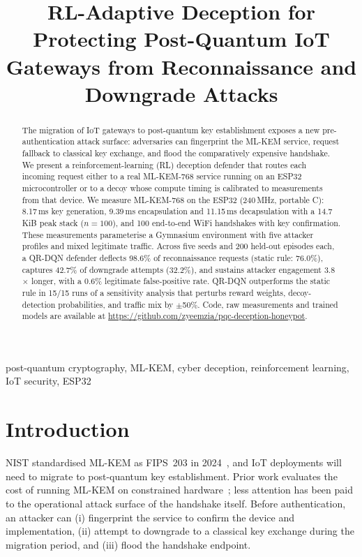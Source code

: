 \documentclass[conference]{IEEEtran}
\begin{document}
\title{RL-Adaptive Deception for Protecting Post-Quantum IoT Gateways from Reconnaissance and Downgrade Attacks}

\author{
}

\maketitle

\begin{abstract}
The migration of IoT gateways to post-quantum key establishment exposes a new
pre-authentication attack surface: adversaries can fingerprint the ML-KEM service,
request fallback to classical key exchange, and flood the comparatively expensive
handshake. We present a reinforcement-learning (RL) deception defender that routes
each incoming request either to a real ML-KEM-768 service running on an ESP32
microcontroller or to a decoy whose compute timing is calibrated to measurements
from that device. We measure ML-KEM-768 on the ESP32 (240\,MHz, portable C):
8.17\,ms key generation, 9.39\,ms encapsulation and 11.15\,ms decapsulation with a
14.7\,KiB peak stack ($n=100$), and 100 end-to-end WiFi handshakes with key
confirmation. These measurements parameterise a Gymnasium environment with five
attacker profiles and mixed legitimate traffic. Across five seeds and 200 held-out
episodes each, a QR-DQN defender deflects 98.6\% of reconnaissance requests
(static rule: 76.0\%), captures 42.7\% of downgrade attempts (32.2\%), and
sustains attacker engagement 3.8$\times$ longer, with a 0.6\% legitimate
false-positive rate. QR-DQN outperforms the static rule in 15/15 runs of a
sensitivity analysis that perturbs reward weights, decoy-detection probabilities,
and traffic mix by $\pm$50\%. Code, raw measurements and trained models are
available at \url{https://github.com/zyeemzia/pqc-deception-honeypot}.
\end{abstract}

\begin{IEEEkeywords}
post-quantum cryptography, ML-KEM, cyber deception, reinforcement learning, IoT security, ESP32
\end{IEEEkeywords}

\section{Introduction}
NIST standardised ML-KEM as FIPS~203 in 2024~\cite{fips203}, and IoT
deployments will need to migrate to post-quantum key establishment. Prior work
evaluates the cost of running ML-KEM on constrained hardware~\cite{pqm4,azevedo,nagy};
less attention has
been paid to the operational attack surface of the handshake itself. Before
authentication, an attacker can (i) fingerprint the service to confirm the device
and implementation, (ii) attempt to downgrade to a classical key exchange during
the migration period, and (iii) flood the handshake endpoint.
\end{document}
